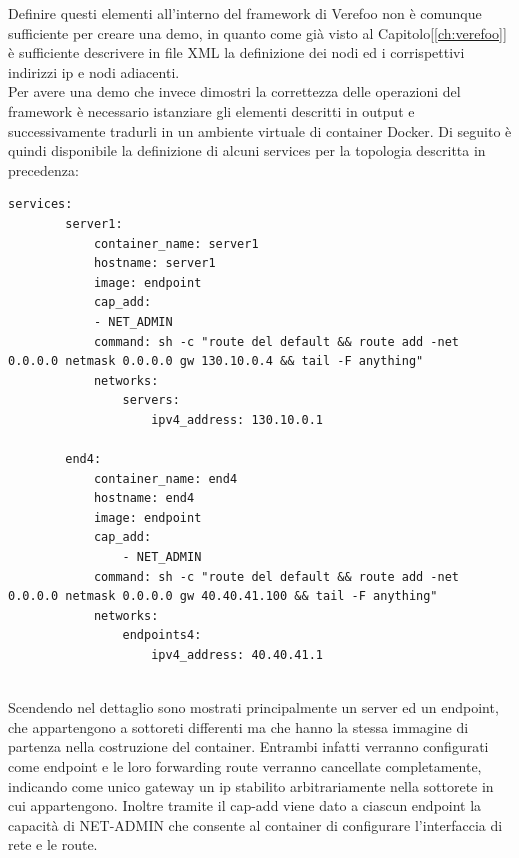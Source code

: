 Definire questi elementi all'interno del framework di Verefoo non è comunque sufficiente per creare una demo, in quanto come già visto al Capitolo[\ref{ch:verefoo}] è sufficiente descrivere in file XML la definizione dei nodi ed i corrispettivi indirizzi ip e nodi adiacenti. \\
Per avere una demo che invece dimostri la correttezza delle operazioni del framework è necessario istanziare gli elementi descritti in output e successivamente tradurli in un ambiente virtuale di container Docker. Di seguito è quindi disponibile la definizione di alcuni services
per la topologia descritta in precedenza:

\begin{lstlisting}[style=yaml,caption={Definizione di Services dell'ambiente virtuale DemoA},label=composeDemoA]
    services:
        server1:
            container_name: server1
            hostname: server1
            image: endpoint
            cap_add:
            - NET_ADMIN
            command: sh -c "route del default && route add -net 0.0.0.0 netmask 0.0.0.0 gw 130.10.0.4 && tail -F anything"
            networks:
                servers:
                    ipv4_address: 130.10.0.1
    
        end4:
            container_name: end4
            hostname: end4
            image: endpoint
            cap_add:
                - NET_ADMIN
            command: sh -c "route del default && route add -net 0.0.0.0 netmask 0.0.0.0 gw 40.40.41.100 && tail -F anything"
            networks:
                endpoints4:
                    ipv4_address: 40.40.41.1
    
\end{lstlisting}

Scendendo nel dettaglio sono mostrati principalmente un server ed un endpoint, che appartengono a sottoreti differenti ma che hanno la stessa immagine di partenza nella costruzione del container.
Entrambi infatti verranno configurati come endpoint e le loro forwarding route verranno cancellate completamente, indicando come unico gateway un ip stabilito arbitrariamente nella sottorete in cui appartengono.
Inoltre tramite il cap-add viene dato a ciascun endpoint la capacità di NET-ADMIN che consente al container di configurare l'interfaccia di rete e le route.

